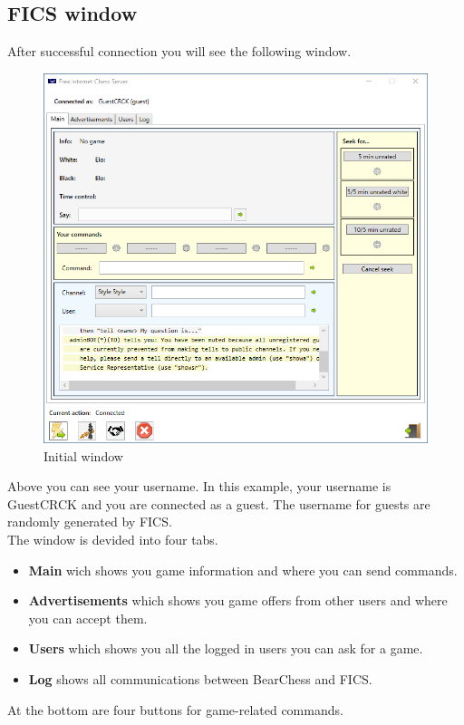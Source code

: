 \documentclass[11pt,a4paper]{article}
\begin{document}
\subsection{FICS window}

After successful connection you will see the following window.

\begin{figure}[H]
	\centering
	\includegraphics[scale=0.6]{fics3.png}
	\caption{Initial window}
	\label{fig:fics3}
\end{figure}

Above you can see your username. In this example, your username is GuestCRCK and you are connected as a guest. The username for guests are randomly generated by FICS.\\
The window is devided into four tabs. 
\begin{itemize}
	\item \textbf{Main} wich shows you game information and where you can send commands.
	\item \textbf{Advertisements} which shows you game offers from other users and where you can accept them.
	\item \textbf{Users} which shows you all the logged in users you can ask for a game.
	\item \textbf{Log} shows all communications between BearChess and FICS.
\end{itemize}
At the bottom are four buttons for game-related commands.
\end{document}
